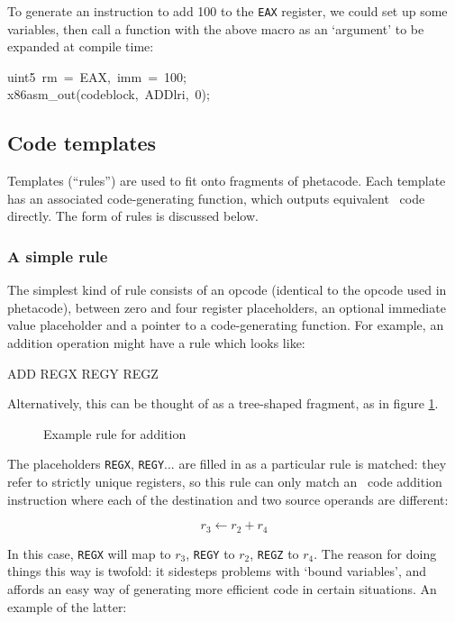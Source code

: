 To generate an instruction to add 100 to the {\tt EAX} register, we could set up some variables, then call a function with the above macro as an `argument' to be expanded at compile time:

\begin{code}
uint5~rm~=~EAX,~imm~=~100;\\
x86asm\_out(codeblock,~ADDlri,~0);
\end{code}

\subsection{Code templates}

Templates (``rules'') are used to fit onto fragments of phetacode. Each template has an associated code-generating function, which outputs equivalent \ia\ code directly. The form of rules is discussed below.

\subsubsection{A simple rule}

The simplest kind of rule consists of an opcode (identical to the opcode used in phetacode), between zero and four register placeholders, an optional immediate value placeholder and a pointer to a code-generating function. For example, an addition operation might have a rule which looks like:

\begin{code}
ADD REGX REGY REGZ
\end{code}

Alternatively, this can be thought of as a tree-shaped fragment, as in figure \ref{addrule}.

\begin{figure}[tbh]

\centerline{}

\caption{\label{addrule}Example rule for addition}
\end{figure}

The placeholders {\tt REGX}, {\tt REGY}... are filled in as a particular rule is matched: they refer to strictly unique registers, so this rule can only match an \int\ code addition instruction where each of the destination and two source operands are different:

\[r_3 \leftarrow r_2 + r_4\]

In this case, {\tt REGX} will map to $r_3$, {\tt REGY} to $r_2$, {\tt REGZ} to $r_4$. The reason for doing things this way is twofold: it sidesteps problems with `bound variables', and affords an easy way of generating more efficient code in certain situations. An example of the latter:


